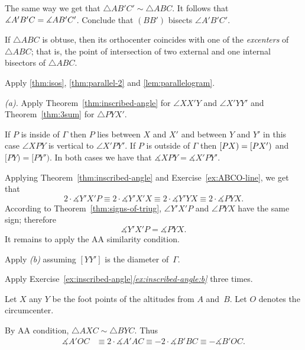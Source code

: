 The same way we get that $\triangle AB'C'\sim \triangle ABC$.
It follows that $\measuredangle A'B'C\z=\measuredangle AB'C'$.
Conclude that $(BB')$ bisects $\angle A'B'C'$.

If $\triangle ABC$ is obtuse, then its orthocenter coincides with one of the \emph{excenters} of $\triangle ABC$;
that is, 
the point of intersection of two external and one internal bisectors of $\triangle ABC$.
 
 Apply \ref{thm:isos}, \ref{thm:parallel-2} 
and \ref{lem:parallelogram}.

\setcounter{eqtn}{0}

 \textit{(a).}
Apply Theorem~\ref{thm:inscribed-angle} for $\angle XX'Y$ and $\angle X'YY'$
and Theorem~\ref{thm:3sum} for $\triangle PYX'$.

 If $P$ is inside of $\Gamma$ then $P$ lies between $X$ and $X'$ and between $Y$ and $Y'$ in this case $\angle XPY$ is vertical to $\angle X'PY'$.
If $P$ is outside of $\Gamma$ then $[PX)\z=[PX')$ and $[PY)=[PY')$.
In both cases we have that $\measuredangle XPY=\measuredangle X'PY'$.

Applying Theorem~\ref{thm:inscribed-angle} and Exercise~\ref{ex:ABCO-line}, we get that
\[2\cdot \measuredangle Y'X'P
\equiv
2\cdot \measuredangle Y'X'X 
\equiv
2\cdot\measuredangle Y'YX
\equiv
2\cdot\measuredangle PYX.\]
According to Theorem~\ref{thm:signs-of-triug}, $\angle Y'X'P$ and $\angle PYX$ have the same sign;
therefore
$$\measuredangle Y'X'P= \measuredangle PYX.$$
It remains to apply the AA similarity condition.

 Apply \textit{(b)} assuming $[YY']$ is the diameter of~$\Gamma$. 

 Apply Exercise~\ref{ex:inscribed-angle}\textit{\ref{ex:inscribed-angle:b}}
three times.

Let $X$ any $Y$ be the foot points of the altitudes from $A$ and~$B$.
Let $O$ denotes the circumcenter.
 
By AA condition, $\triangle A X C\sim \triangle B Y C$.
Thus 
\begin{align*}
\measuredangle A'OC
&\equiv 
2\cdot \measuredangle A' A C
\equiv-2\cdot\measuredangle B' B C
\equiv-\measuredangle B'OC.
\end{align*}

